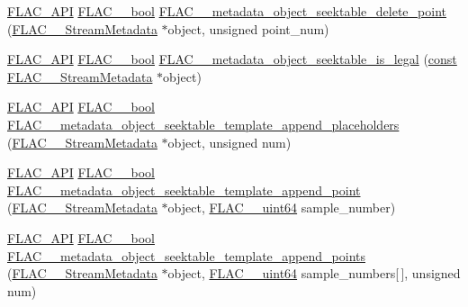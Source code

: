 \begin{DoxyCompactItemize}
\item 
\hyperlink{group__flac__export_ga56ca07df8a23310707732b1c0007d6f5}{F\+L\+A\+C\+\_\+\+A\+PI} \hyperlink{ordinals_8h_a95103469f1cbd78b8cf250194985b34e}{F\+L\+A\+C\+\_\+\+\_\+bool} \hyperlink{group__flac__metadata__object_ga5a865f792845cbf22b5935c3d96568d1}{F\+L\+A\+C\+\_\+\+\_\+metadata\+\_\+object\+\_\+seektable\+\_\+delete\+\_\+point} (\hyperlink{struct_f_l_a_c_____stream_metadata}{F\+L\+A\+C\+\_\+\+\_\+\+Stream\+Metadata} $\ast$object, unsigned point\+\_\+num)
\item 
\hyperlink{group__flac__export_ga56ca07df8a23310707732b1c0007d6f5}{F\+L\+A\+C\+\_\+\+A\+PI} \hyperlink{ordinals_8h_a95103469f1cbd78b8cf250194985b34e}{F\+L\+A\+C\+\_\+\+\_\+bool} \hyperlink{group__flac__metadata__object_ga08f33e2ef85d72363dda82de3208ed1e}{F\+L\+A\+C\+\_\+\+\_\+metadata\+\_\+object\+\_\+seektable\+\_\+is\+\_\+legal} (\hyperlink{getopt1_8c_a2c212835823e3c54a8ab6d95c652660e}{const} \hyperlink{struct_f_l_a_c_____stream_metadata}{F\+L\+A\+C\+\_\+\+\_\+\+Stream\+Metadata} $\ast$object)
\item 
\hyperlink{group__flac__export_ga56ca07df8a23310707732b1c0007d6f5}{F\+L\+A\+C\+\_\+\+A\+PI} \hyperlink{ordinals_8h_a95103469f1cbd78b8cf250194985b34e}{F\+L\+A\+C\+\_\+\+\_\+bool} \hyperlink{group__flac__metadata__object_gae9d8c43dc78bde9778c4e57c5f74b025}{F\+L\+A\+C\+\_\+\+\_\+metadata\+\_\+object\+\_\+seektable\+\_\+template\+\_\+append\+\_\+placeholders} (\hyperlink{struct_f_l_a_c_____stream_metadata}{F\+L\+A\+C\+\_\+\+\_\+\+Stream\+Metadata} $\ast$object, unsigned num)
\item 
\hyperlink{group__flac__export_ga56ca07df8a23310707732b1c0007d6f5}{F\+L\+A\+C\+\_\+\+A\+PI} \hyperlink{ordinals_8h_a95103469f1cbd78b8cf250194985b34e}{F\+L\+A\+C\+\_\+\+\_\+bool} \hyperlink{group__flac__metadata__object_ga9ce1940ca29d71739316cf104256c078}{F\+L\+A\+C\+\_\+\+\_\+metadata\+\_\+object\+\_\+seektable\+\_\+template\+\_\+append\+\_\+point} (\hyperlink{struct_f_l_a_c_____stream_metadata}{F\+L\+A\+C\+\_\+\+\_\+\+Stream\+Metadata} $\ast$object, \hyperlink{ordinals_8h_aa78c8c70a3eb8a58af7436f278acde8e}{F\+L\+A\+C\+\_\+\+\_\+uint64} sample\+\_\+number)
\item 
\hyperlink{group__flac__export_ga56ca07df8a23310707732b1c0007d6f5}{F\+L\+A\+C\+\_\+\+A\+PI} \hyperlink{ordinals_8h_a95103469f1cbd78b8cf250194985b34e}{F\+L\+A\+C\+\_\+\+\_\+bool} \hyperlink{group__flac__metadata__object_gac27a59879fa8cdf47b75f8d73de82f0e}{F\+L\+A\+C\+\_\+\+\_\+metadata\+\_\+object\+\_\+seektable\+\_\+template\+\_\+append\+\_\+points} (\hyperlink{struct_f_l_a_c_____stream_metadata}{F\+L\+A\+C\+\_\+\+\_\+\+Stream\+Metadata} $\ast$object, \hyperlink{ordinals_8h_aa78c8c70a3eb8a58af7436f278acde8e}{F\+L\+A\+C\+\_\+\+\_\+uint64} sample\+\_\+numbers\mbox{[}$\,$\mbox{]}, unsigned num)

\end{DoxyCompactItemize}
